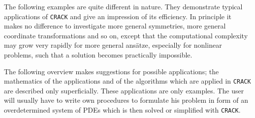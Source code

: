 The following examples are quite different in nature. They demonstrate
typical applications of {\tt CRACK} and give an impression of its efficiency.
In principle it makes no difference to investigate more general
symmetries, more general coordinate transformations and so on, except that the
computational complexity may grow very rapidly for more general
ans\"atze, especially for nonlinear problems, such that a solution
becomes practically impossible.

The following overview makes suggestions for possible
applications; the mathematics of the applications and of the
algorithms which are applied in {\tt CRACK} are described only
superficially. These applications are only examples. The user will usually
have to write own procedures to formulate his problem in form of
an overdetermined system of PDEs which is then solved or simplified with
{\tt CRACK}.

